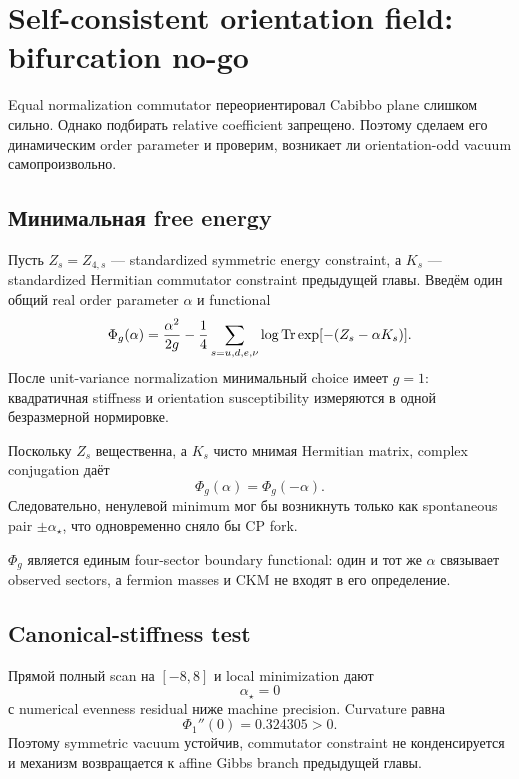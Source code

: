 \chapter{Self-consistent orientation field: bifurcation no-go}

Equal normalization commutator переориентировал Cabibbo plane слишком сильно.
Однако подбирать relative coefficient запрещено. Поэтому сделаем его
динамическим order parameter и проверим, возникает ли orientation-odd vacuum
самопроизвольно.

\section{Минимальная free energy}

Пусть \(Z_s=Z_{4,s}\) --- standardized symmetric energy constraint, а
\(K_s\) --- standardized Hermitian commutator constraint предыдущей главы.
Введём один общий real order parameter \(\alpha\) и functional
\begin{equation}
 \Phi_g(\alpha)=\frac{\alpha^2}{2g}
 -\frac14\sum_{s=u,d,e,\nu}
 \log\operatorname{Tr}\exp[-(Z_s-\alpha K_s)].
\end{equation}
После unit-variance normalization минимальный choice имеет \(g=1\):
квадратичная stiffness и orientation susceptibility измеряются в одной
безразмерной нормировке.

Поскольку \(Z_s\) вещественна, а \(K_s\) чисто мнимая Hermitian matrix,
complex conjugation даёт
\begin{equation}
 \Phi_g(\alpha)=\Phi_g(-\alpha).
\end{equation}
Следовательно, ненулевой minimum мог бы возникнуть только как spontaneous
pair \(\pm\alpha_\star\), что одновременно сняло бы CP fork.

\begin{proposition}
\(\Phi_g\) является единым four-sector boundary functional: один и тот же
\(\alpha\) связывает observed sectors, а fermion masses и CKM не входят в его
определение.
\end{proposition}

\section{Canonical-stiffness test}

Прямой полный scan на \([-8,8]\) и local minimization дают
\begin{equation}
 \alpha_\star=0
\end{equation}
с numerical evenness residual ниже machine precision. Curvature равна
\begin{equation}
 \Phi_1''(0)=0.324305>0.
\end{equation}
Поэтому symmetric vacuum устойчив, commutator constraint не конденсируется и
механизм возвращается к affine Gibbs branch предыдущей главы.

